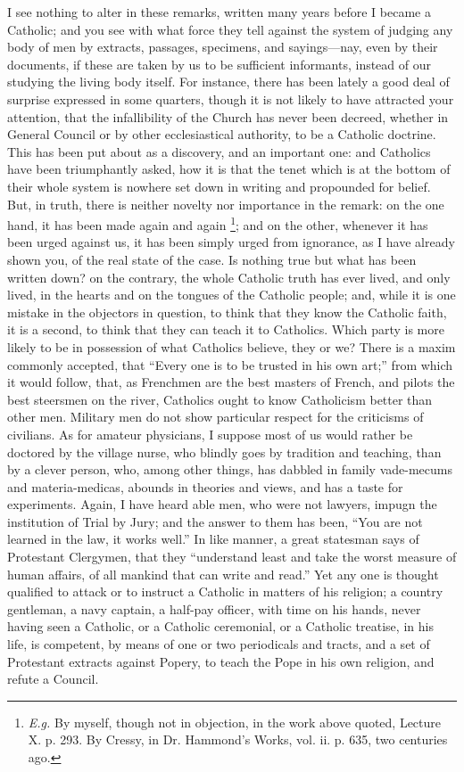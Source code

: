 I see nothing to alter in these remarks, written many
years before I became a Catholic; and you see with what
force they tell against the system of judging any body of
men by extracts, passages, specimens, and sayings—nay,
even by their documents, if these are taken by us to be
sufficient informants, instead of our studying the living
body itself. For instance, there has been lately a good
deal of surprise expressed in some quarters, though it is
not likely to have attracted your attention, that the
infallibility of the Church has never been decreed,
whether in General Council or by other ecclesiastical
authority, to be a Catholic doctrine. This has been put
about as a discovery, and an important one: and Catholics
have been triumphantly asked, how it is that the tenet
which is at the bottom of their whole system is nowhere
set down in writing and propounded for belief. But, in
truth, there is neither novelty nor importance in the
remark: on the one hand, it has been made again and again \footnote{\emph{E.g.} By myself, though
not in objection, in the work above quoted, Lecture X. p.
293. By Cressy, in Dr. Hammond's Works, vol. ii. p. 635,
two centuries ago.};
and on the other, whenever it has been urged against us,
it has been simply urged from ignorance, as I have
already shown you, of the real state of the case. Is
nothing true but what has been written down? on the
contrary, the whole Catholic truth has ever lived, and
only lived, in the hearts and on the tongues of the
Catholic people; and, while it is one mistake in the
objectors in question, to think that they know the
Catholic faith, it is a second, to think that they can
teach it to Catholics. Which party is more likely to be
in possession of what Catholics believe, they or we?
There is a maxim commonly accepted, that ``Every one
is to be trusted in his own art;'' from which it
would follow, that, as Frenchmen are the best masters of
French, and pilots the best steersmen on the river,
Catholics ought to know Catholicism better than other
men. Military men do not show particular respect for the
criticisms of civilians. As for amateur physicians, I
suppose most of us would rather be doctored by the
village nurse, who blindly goes by tradition and
teaching, than by a clever person, who, among other
things, has dabbled in family vade-mecums and
materia-medicas, abounds in theories and views, and has a
taste for experiments. Again, I have heard able men, who
were not lawyers, impugn the institution of Trial by
Jury; and the answer to them has been, ``You are not
learned in the law, it works well.'' In like manner,
a great statesman says of Protestant Clergymen, that they
``understand least and take the worst measure of
human affairs, of all mankind that can write and
read.'' Yet any one is thought qualified to attack or
to instruct a Catholic in matters of his religion; a
country gentleman, a navy captain, a half-pay officer,
with time on his hands, never having seen a Catholic, or
a Catholic ceremonial, or a Catholic treatise, in his
life, is competent, by means of one or two periodicals
and tracts, and a set of Protestant extracts against
Popery, to teach the Pope in his own religion, and refute
a Council.

